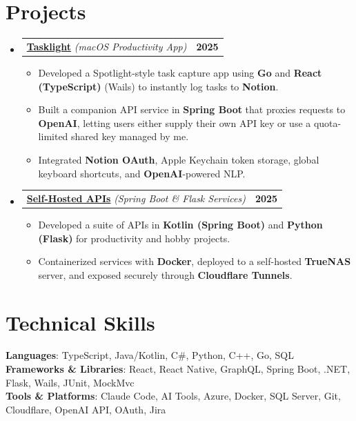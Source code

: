 \documentclass[letterpaper,11pt]{article}
\makeatletter
\newcommand{\resumeItem}[1]{
\item\small{
    {#1 \vspace{-2pt}}
  }
}
\newcommand{\resumeProjectHeading}[2]{
  \vspace{-5pt}
\item
  \begin{tabular*}{1.001\textwidth}{l@{\extracolsep{\fill}}r}
    \small#1 & \textbf{\small #2}\\
  \end{tabular*}\vspace{-20pt}
}
\newcommand{\resumeSubHeadingListStart}{
\begin{itemize}[leftmargin=0.0in, label={}]}
\newcommand{\resumeSubHeadingListEnd}{
\end{itemize}}
\newcommand{\resumeItemListStart}{
\begin{itemize}}
\newcommand{\resumeItemListEnd}{
\end{itemize}\vspace{-5pt}}
\makeatother
\begin{document}
\section{Projects}
\resumeSubHeadingListStart

\resumeProjectHeading
{\textbf{\href{https://github.com/imjamesonzeller/tasklight-v3}{Tasklight}} \emph{(macOS Productivity App)}}{2025}  \resumeItemListStart
\resumeItem{Developed a Spotlight-style task capture app using \textbf{Go} and \textbf{React (TypeScript)} (Wails) to instantly log tasks to \textbf{Notion}.}
\resumeItem{Built a companion API service in \textbf{Spring Boot} that proxies requests to \textbf{OpenAI}, letting users either supply their own API key or use a quota-limited shared key managed by me.}
\resumeItem{Integrated \textbf{Notion OAuth}, Apple Keychain token storage, global keyboard shortcuts, and \textbf{OpenAI}-powered NLP.}
\resumeItemListEnd

\resumeProjectHeading
{\textbf{\href{https://github.com/imjamesonzeller/api}{Self-Hosted APIs}} \emph{(Spring Boot \& Flask Services)}}{2025}
\resumeItemListStart
\resumeItem{Developed a suite of APIs in \textbf{Kotlin (Spring Boot)} and \textbf{Python (Flask)} for productivity and hobby projects.}
\resumeItem{Containerized services with \textbf{Docker}, deployed to a self-hosted \textbf{TrueNAS} server, and exposed securely through \textbf{Cloudflare Tunnels}.}
\resumeItemListEnd

\resumeSubHeadingListEnd

\section{Technical Skills}
\begin{itemize}[leftmargin=0.15in, label={}]
    \small{
    \item{
        \textbf{Languages}{: TypeScript, Java/Kotlin, C\#, Python, C++, Go, SQL} \\
        \textbf{Frameworks \& Libraries}{: React, React Native, GraphQL, Spring Boot, .NET, Flask, Wails, JUnit, MockMvc} \\
        \textbf{Tools \& Platforms}{: Claude Code, AI Tools, Azure, Docker, SQL Server, Git, Cloudflare, OpenAI API, OAuth, Jira} \\
    }}
\end{itemize}
\end{document}
